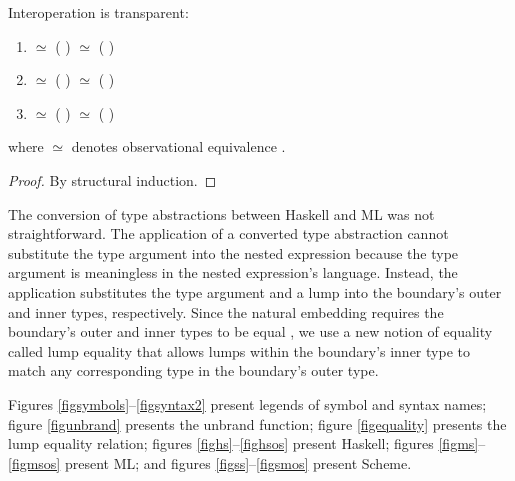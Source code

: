 \begin{theorem}{Interoperation is transparent:}
\label{thmtransparent}
\begin{enumerate}
\item
\varexph
$\simeq$
\exphm
{
	\vartyh
}
{
	\vartym
}
{
	(
	\expmh
	{
		\vartym
	}
	{
		\vartyh
	}
	{
		\varexph
	}
	)
}
$\simeq$
\exphs
{
	\varcsh
}
{
	(
	\expsh
	{
		\varcsh
	}
	{
		\varexph
	}
	)
}
\item
\varexpm
$\simeq$
\expmh
{
	\vartym
}
{
	\vartyh
}
{
	(
	\exphm
	{
		\vartyh
	}
	{
		\vartym
	}
	{
		\varexpm
	}
	)
}
$\simeq$
\expms
{
	\varcsm
}
{
	(
	\expsm
	{
		\varcsm
	}
	{
		\varexpm
	}
	)
}
\item
\varexps
$\simeq$
\expsh
{
	\varcsh
}
{
	(
	\exphs
	{
		\varcsh
	}
	{
		\first
		{
			\varexps
		}
	}
	)
}
$\simeq$
\expsm
{
	\varcsm
}
{
	(
	\expms
	{
		\varcsm
	}
	{
		\first
		{
			\varexps
		}
	}
	)
}
\end{enumerate}
where $\simeq$ denotes observational equivalence \cite{felleisen09}.
\begin{proof}
By structural induction.
\end{proof}
\end{theorem}

The conversion of type abstractions between Haskell and ML was not straightforward. The application of a converted type abstraction cannot substitute the type argument into the nested expression because the type argument is meaningless in the nested expression's language. Instead, the application substitutes the type argument and a lump into the boundary's outer and inner types, respectively. Since the natural embedding requires the boundary's outer and inner types to be equal \cite{matthews07}, we use a new notion of equality called lump equality that allows lumps within the boundary's inner type to match any corresponding type in the boundary's outer type.

Figures \ref{figsymbols}--\ref{figsyntax2} present legends of symbol and syntax names; figure \ref{figunbrand} presents the unbrand function; figure \ref{figequality} presents the lump equality relation; figures \ref{fighs}--\ref{fighsos} present Haskell; figures \ref{figms}--\ref{figmsos} present ML; and figures \ref{figss}--\ref{figsmos} present Scheme.

\clearpage



\clearpage



